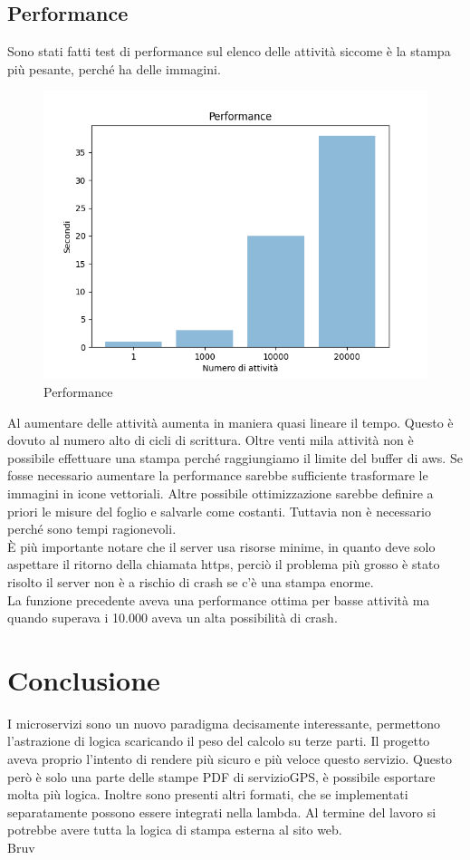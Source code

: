 \documentclass[12pt]{article}
\begin{document}
\subsection{Performance}
Sono stati fatti test di performance sul elenco delle attività siccome è la 
stampa più pesante, perché ha delle immagini.  
\begin{figure}[H]
\includegraphics[width =\textwidth]{performance.png}
\caption{Performance}
\label{fig:mesh6}
\end{figure}
Al aumentare delle attività aumenta in maniera quasi lineare il tempo. Questo 
è dovuto al numero alto di cicli di scrittura.
Oltre venti mila attività non è possibile effettuare una stampa perché 
raggiungiamo il limite del buffer di aws. Se fosse necessario aumentare 
la performance sarebbe sufficiente trasformare le immagini in icone vettoriali.
Altre possibile ottimizzazione sarebbe definire a priori le misure del foglio e 
salvarle come costanti. Tuttavia non è necessario perché sono tempi ragionevoli.
\\ È più importante notare che il server usa risorse minime, in quanto deve 
solo aspettare il ritorno della chiamata https, perciò il problema più grosso è 
stato risolto il server non è a rischio di crash se c'è una stampa enorme.
\\ La funzione precedente aveva una performance ottima per basse attività 
ma quando superava i 10.000 aveva un alta possibilità di crash.


\thispagestyle{empty}
\newpage 

\section*{Conclusione}
I microservizi sono un nuovo paradigma decisamente interessante, permettono 
l'astrazione di logica scaricando il peso del calcolo su terze parti. 
Il progetto aveva proprio l'intento di rendere più sicuro e più veloce questo 
servizio. Questo però è solo una parte delle stampe PDF di servizioGPS, è 
possibile esportare molta più logica. Inoltre sono presenti altri formati, che 
se implementati separatamente possono essere integrati nella lambda. Al termine 
del lavoro si potrebbe avere tutta la logica di stampa esterna al sito web. 
\\ Bruv
\end{document}
